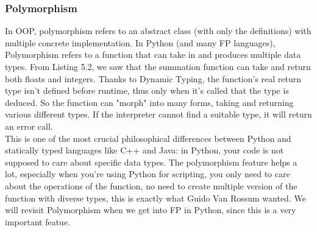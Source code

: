 \documentclass[twoside,final]{hcmut-report}
\begin{document}
\subsubsection{Polymorphism}
\hspace*{1mm} In OOP, polymorphism refers to an abstract class (with only the definitions) with multiple concrete implementation. In Python (and many FP languages), Polymorphism refers to a function that can take in and produces multiple data types. From Listing 5.2, we saw that the summation function can take and return both floats and integers. Thanks to Dynamic Typing, the function's real return type isn't defined before runtime, thus only when it's called that the type is deduced.  So the function can "morph" into many forms, taking and returning various different types. If the interpreter cannot find a suitable type, it will return an error call.
\\ \hspace*{6.5mm}This is one of the most crucial philosophical differences between Python and statically typed languages like C++ and Java: in Python, your code is not supposed to care about specific data types. The polymorphism feature helps a lot, especially when you're using Python for scripting, you only need to care about the operations of the function, no need to create multiple version of the function with diverse types, this is exactly what Guido Van Rossum wanted. We will revisit Polymorphism when we get into FP in Python, since this is a very important featue. 
\end{document}
